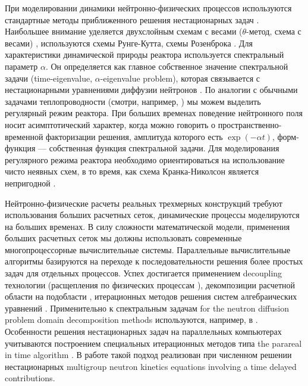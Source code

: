 \documentclass[authoryear]{elsarticle}
\begin{document}
При моделировании динамики нейтронно-физических процессов используются стандартные методы приближенного решения нестационарных
задач \citep{sutton1996diffusion,cho2005fundamentals,stacey}. Наибольшее внимание уделяется двухслойным схемам с весами ($\theta$-метод, схема с весами) \citep{Ascher2008,LeVeque2007,HundsdorferVerwer2003},
используются схемы Рунге-Кутта, схемы Розенброка \citep{Butcher2008,HairerWanner2010}.
Для характеристики динамической природы реактора используется 
спектральный параметр $\alpha$. Он определяется как главное собственное
значение 
спектральной задачи (time-eigenvalue, $\alpha$-eigenvalue problem), которая связывается с нестационарными уравнениями диффузии нейтронов
\citep{Bell1970,modak2007scheme,verdu20103d}.
По аналогии с обычными задачами теплопроводности (смотри, например, \cite{luikov2012analytical,samarskii1996computational}) мы можем выделить регулярный режим
реактора. При больших временах поведение нейтронного поля носит асимптотический характер, когда можно
говорить о пространственно-временной факторизации решения,
амплитуда которого есть $\exp(-\alpha t)$, форм-функция --- собственная функция спектральной задачи. 
Для моделирования регулярного режима реактора необходимо ориентироваться на использование чисто неявных схем, 
в то время, как схема Кранка-Николсон является непригодной \citep{nd-mm}.

Нейтронно-физические расчеты реальных трехмерных конструкций требуют использования больших расчетных сеток,
динамические процессы моделируются на больших временах. В силу сложности математической модели,
применения больших расчетных сеток мы должны использовать современные многопроцессорные вычислительные системы.
Параллельные вычислительные алгоритмы базируются на переходе  к последовательности решения более простых
задач для отдельных процессов. Успех достигается применением decoupling технологии (расщепления по физических процессам
\citep{Vabishchevich2014}), декомпозиции расчетной области на подобласти \citep{ToselliWidlund2005},
итерационных методов решения систем алгебраических уравнений \citep{Saad2003}. 
Применительно к спектральным задачам for the neutron diffusion problem  
domain decomposition methods используются, например, в \cite{guerin2010domain}. 
Особенности решения нестационарных задач на параллельных компьютерах 
учитываются построением специальных итерационных методов типа the parareal in time algorithm \citep{maday2005parareal}. 
В работе \cite{baudron2014parareal} такой подход реализован при численном решении нестационарных multigroup neutron kinetics
equations involving a time delayed contributions.
\end{document}
